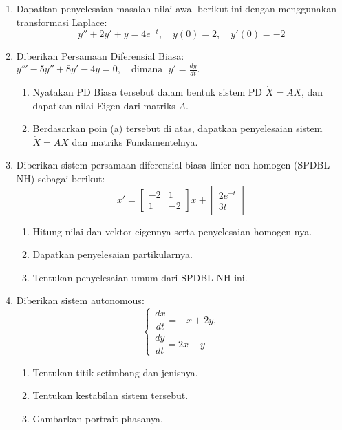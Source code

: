 \documentclass[10pt,openany,a4paper]{article}
\begin{document}
\begin{enumerate}
  \item Dapatkan penyelesaian masalah nilai awal berikut ini dengan menggunakan transformasi Laplace:
        \[
          y'' + 2y' + y = 4e^{-t}, \quad y(0) = 2, \quad y'(0) = -2
        \]

  \item Diberikan Persamaan Diferensial Biasa:
        $
          y''' - 5y'' + 8y' - 4y = 0, \quad \text{dimana } \; y' = \frac{dy}{dt}.
        $
        \begin{enumerate}
          \item Nyatakan PD Biasa tersebut dalam bentuk sistem PD
                \(\dot{X} = A X\), dan dapatkan nilai Eigen dari matriks \(A\).
          \item Berdasarkan poin (a) tersebut di atas, dapatkan penyelesaian sistem
                \(\dot{X} = A X\) dan matriks Fundamentelnya.
        \end{enumerate}

  \item Diberikan sistem persamaan diferensial biasa linier non-homogen (SPDBL-NH) sebagai berikut:
        \[
          x' =
          \begin{bmatrix}
            -2 & 1  \\
            1  & -2
          \end{bmatrix}x
          +
          \begin{bmatrix}
            2e^{-t} \\
            3t
          \end{bmatrix}
        \]
        \begin{enumerate}
          \item Hitung nilai dan vektor eigennya serta penyelesaian homogen-nya.
          \item Dapatkan penyelesaian partikularnya.
          \item Tentukan penyelesaian umum dari SPDBL-NH ini.
        \end{enumerate}

  \item Diberikan sistem autonomous:
        \[
          \begin{cases}
            \dfrac{dx}{dt} = -x + 2y, \\[6pt]
            \dfrac{dy}{dt} = 2x - y
          \end{cases}
        \]
        \begin{enumerate}
          \item Tentukan titik setimbang dan jenisnya.\\
          \item Tentukan kestabilan sistem tersebut.\\
          \item Gambarkan portrait phasanya.
        \end{enumerate}
\end{enumerate}
\end{document}
